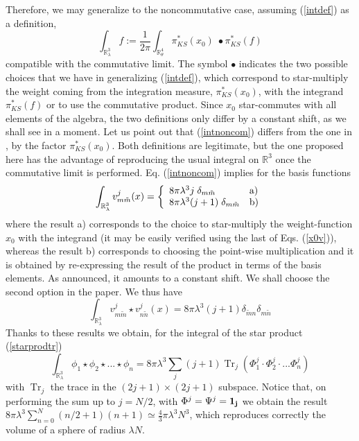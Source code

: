 \documentclass[a4paper,11pt]{article}
\numberwithin{equation}{section}
\newcommand{\be}{\begin{equation}}
\newcommand{\ee}{\end{equation}}
\newcommand{\eqn}[1]{(\ref{#1})}
\newcommand\Rl{\mathbb{R}^3_\lambda}
\newcommand\gR{{\mathbb R}}
\def\gR{{\mathbb R}}
\DeclareMathOperator{\tr}{Tr}
\theoremstyle{nonumberplain}
\begin{document}
Therefore, we may generalize to  the noncommutative case, assuming    \eqn{intdef}  as a definition,
\be
\int_{\gR^3_\lambda} f:=\frac{1}{2\pi}\int_{\gR^{4}_\theta } \pi^*_{KS}(x_0) \;  \bullet  \pi^*_{KS}(f)  \label{intnoncom}
\ee
compatible with the commutative limit. The symbol $\bullet$ indicates the two possible choices that we have in generalizing \eqn{intdef}, which correspond to  star-multiply  the weight coming from the integration measure, $\pi^*_{KS}(x_0)$,  with the integrand  $ \pi^*_{KS}(f)$ or to use the commutative product. Since $x_0$ star-commutes with all elements of the algebra, the two definitions only differ by a constant shift, as we shall see in a moment. Let us point out that \eqn{intnoncom} differs from the one in   \cite{vit-wal-12}, by  the factor  $\pi^*_{KS}(x_0)$.
Both definitions are legitimate, but the one proposed here has the advantage of reproducing the usual integral on $\gR^3$ once the commutative limit is performed.
Eq. \eqn{intnoncom} implies for the basis functions
\be
\int_{\Rl} v^j_{m\tilde m} (x)= \left\{
\begin{array}{ll}
8\pi \lambda^3 j\; \delta_{m \tilde m}   &{\rm a)}\\
8\pi\lambda^3 (j+1)\; \delta_{m \tilde m}& {\rm b)}
\end{array}
\right.
\ee
where the result a) corresponds to  the choice to star-multiply the weight-function $x_0$ with the integrand (it may be easily verified using the last of Eqs. \eqn{x0v}), whereas the result b) corresponds to choosing the point-wise multiplication and it is obtained by re-expressing the result of the product in terms of the basis elements. As announced, it amounts to a constant shift. We shall choose the second option in the paper.
We thus have
\be
\int_{\Rl} v^j_{m\tilde m}  \star v^j_{n\tilde n} (x)   =
8\pi\lambda^3(j+1)\delta_{\tilde m n }\delta_{m \tilde n} \label{properties2b}
\ee
Thanks to these results we obtain, for the integral of the star product \eqn{starprodtr}
\be
\int_{\mathbb{R}^3_\lambda} \phi_1\star \phi_2\star...\star\phi_n = 8\pi\lambda^3\sum_j (j+1) \tr_j (\Phi_1^j\cdot \Phi_2^j\cdot...\Phi_n^j) \label{integralofprod}
\ee
with $\tr_j$ the trace in the $(2j+1)\times(2j+1)$  subspace.
Notice that, on performing the sum up to $j=N/2$, with $\Phi^j=\Psi^j=  \bf{1}_j$ we obtain the result $8\pi\lambda^3\sum_{n=0}^N(n/2+1)(n+1)\simeq\frac{4}{3}\pi\lambda^3 N^3$, which reproduces correctly  the volume of a sphere of radius $\lambda N$.
\end{document}
